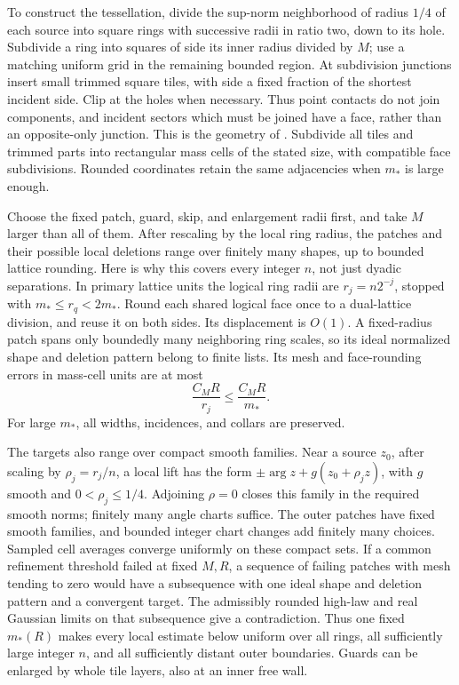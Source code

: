 To construct the tessellation, divide the sup-norm neighborhood of
radius \(1/4\) of each source into square rings with successive radii
in ratio two, down to its hole. Subdivide a ring into squares of side
its inner radius divided by \(M\); use a matching uniform grid in the
remaining bounded region. At subdivision junctions insert small
trimmed square tiles, with side a fixed fraction of the shortest
incident side. Clip at the holes when necessary. Thus point contacts
do not join components, and incident sectors which must be joined
have a face, rather than an opposite-only junction. This is the
geometry of . Subdivide all tiles and trimmed
parts into rectangular mass cells of the stated size, with compatible
face subdivisions. Rounded coordinates retain the same adjacencies
when \(m_*\) is large enough.

Choose the fixed patch, guard, skip, and enlargement radii first, and
take \(M\) larger than all of them. After rescaling by the local ring
radius, the patches and their possible local deletions range over
finitely many shapes, up to bounded lattice rounding. Here is why
this covers every integer \(n\), not just dyadic separations.
In primary lattice units the logical ring radii are \(r_j=n2^{-j}\),
stopped with \(m_*\le r_q<2m_*\). Round each shared logical face
once to a dual-lattice division, and reuse it on both sides.
Its displacement is \(O(1)\). A fixed-radius patch spans only
boundedly many neighboring ring scales, so its ideal normalized
shape and deletion pattern belong to finite lists. Its mesh
and face-rounding errors in mass-cell units are at most
\[
                         \frac{C_M R}{r_j}
                                  \le \frac{C_M R}{m_*}.
\]
For large \(m_*\), all widths, incidences, and collars are preserved.

The targets also range over compact smooth families. Near a
source \(z_0\), after scaling by \(\rho_j=r_j/n\), a local lift
has the form \(\pm\arg z+g(z_0+\rho_jz)\), with \(g\) smooth
and \(0<\rho_j\le1/4\). Adjoining \(\rho=0\) closes this
family in the required smooth norms; finitely many angle
charts suffice. The outer patches have fixed smooth families,
and bounded integer chart changes add finitely many choices.
Sampled cell averages converge uniformly on these compact sets.
If a common refinement threshold failed at fixed \(M,R\), a
sequence of failing patches with mesh tending to zero would
have a subsequence with one ideal shape and deletion pattern
and a convergent target. The admissibly rounded high-law and
real Gaussian limits on that subsequence give a contradiction.
Thus one fixed \(m_*(R)\) makes every local estimate below
uniform over all rings, all sufficiently large integer \(n\),
and all sufficiently distant outer boundaries. Guards can be
enlarged by whole tile layers, also at an inner free wall.

